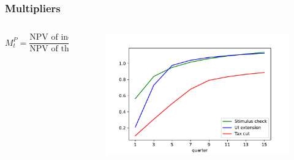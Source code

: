 \documentclass[pdflatex,aspectratio=169]{beamer}
\begin{document}
\begin{frame}
\frametitle{Multipliers}

\begin{columns}

	\begin{column}{0.50\textwidth}
		\begin{equation*}
			M^P_t = \frac{\text{NPV of induced consumption up to $t$}}{\text{NPV of the cost of the policy}}
		\end{equation*}
	\end{column}

	\begin{column}{0.50\textwidth}

	\begin{figure}[t]
		\centering
		\includegraphics[width=\linewidth]{Code/HA-Models/FromPandemicCode/Figures/Cummulative_multipliers}
	\end{figure}

	\end{column}
\end{columns}




\begin{table}[t]
	\center
	
\end{table}

\end{frame}
\end{document}
